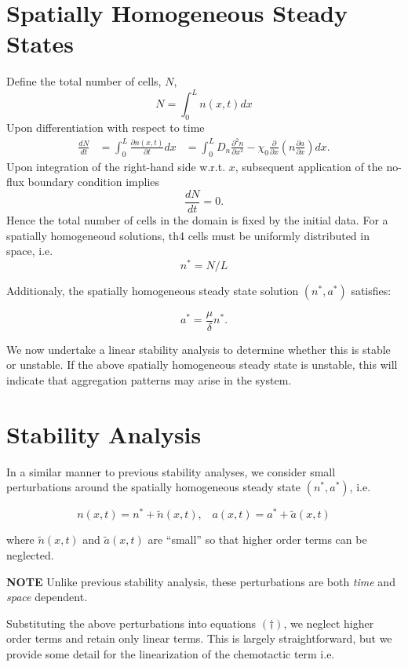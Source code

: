 \documentclass[
  letterpaper,
  DIV=11,
  numbers=noendperiod]{scrreprt}
\theoremstyle{plain}
\theoremstyle{definition}
\theoremstyle{plain}
\theoremstyle{remark}
\begin{document}
\hypertarget{spatially-homogeneous-steady-states-1}{%
\section{Spatially Homogeneous Steady
States}\label{spatially-homogeneous-steady-states-1}}

Define the total number of cells, \(N\), \[
N= \int_0^L n(x,t)dx
\] Upon differentiation with respect to time \[
\begin{aligned}
\frac{dN}{dt} &=\int_0^L \frac{\partial n(x,t)}{\partial t}dx
&=\int_0^L  D_n \frac{\partial ^2 n}{\partial x^2} - \chi_0 \frac{\partial}{\partial x} \left( n \frac{\partial a}{\partial x} \right) dx.
\end{aligned}
\] Upon integration of the right-hand side w.r.t. \(x\), subsequent
application of the no-flux boundary condition implies \[
\frac{dN}{dt}=0.
\] Hence the total number of cells in the domain is fixed by the initial
data. For a spatially homogeneoud solutions, th4 cells must be uniformly
distributed in space, i.e. \[
n^*=N/L
\]

Additionaly, the spatially homogeneous steady state solution
\((n^* , a^* )\) satisfies:

\[
a^*=\frac{\mu}{\delta} n^*.
\]

We now undertake a linear stability analysis to determine whether this
is stable or unstable. If the above spatially homogeneous steady state
is unstable, this will indicate that aggregation patterns may arise in
the system.

\hypertarget{stability-analysis}{%
\section{Stability Analysis}\label{stability-analysis}}

In a similar manner to previous stability analyses, we consider small
perturbations around the spatially homogeneous steady state
\((n^* , a^* )\), i.e.

\[
n(x,t) = n^* + \tilde{n}(x,t), \;\;\; a(x,t) = a^* + \tilde{a}(x,t)
\]

where \(\tilde{n}(x,t)\) and \(\tilde{a}(x,t)\) are ``small'' so that
higher order terms can be neglected.

\textbf{NOTE} Unlike previous stability analysis, these perturbations
are both \emph{time} and \emph{space} dependent.

Substituting the above perturbations into equations \(( \dagger )\), we
neglect higher order terms and retain only linear terms. This is largely
straightforward, but we provide some detail for the linearization of the
chemotactic term i.e.~
\end{document}
